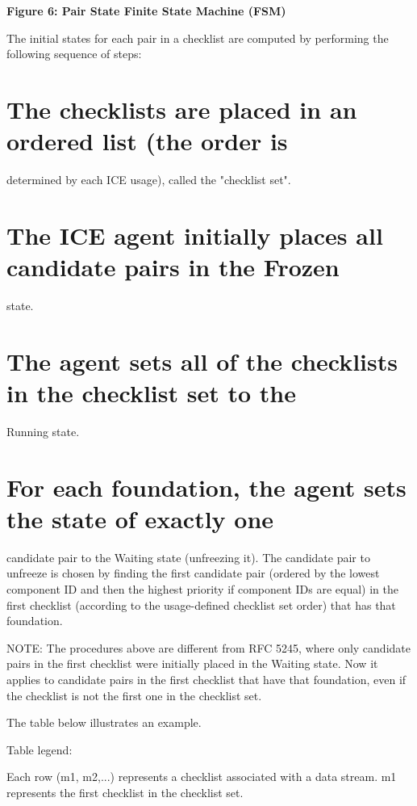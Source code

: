 \documentclass{article}
\begin{document}
\begin{center}
\textbf{Figure 6: Pair State Finite State Machine (FSM)}
\end{center}

The initial states for each pair in a checklist are computed by performing the following sequence of steps:

\section{The checklists are placed in an ordered list (the order is}

determined by each ICE usage), called the "checklist set".

\section{The ICE agent initially places all candidate pairs in the Frozen}

state.

\section{The agent sets all of the checklists in the checklist set to the}

Running state.

\section{For each foundation, the agent sets the state of exactly one}

candidate pair to the Waiting state (unfreezing it).  The candidate pair to unfreeze is chosen by finding the first candidate pair (ordered by the lowest component ID and then the highest priority if component IDs are equal) in the first checklist (according to the usage-defined checklist set order) that has that foundation.

NOTE: The procedures above are different from RFC 5245, where only candidate pairs in the first checklist were initially placed in the Waiting state.  Now it applies to candidate pairs in the first checklist that have that foundation, even if the checklist is not the first one in the checklist set.

The table below illustrates an example.

Table legend:

Each row (m1, m2,...) represents a checklist associated with a data stream. m1 represents the first checklist in the checklist set.
\end{document}
